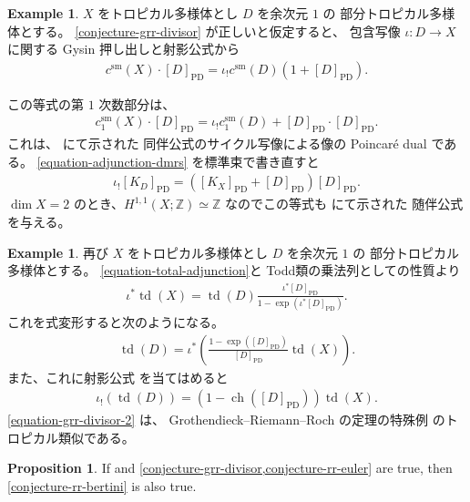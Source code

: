 \documentclass[a4paper,dvipdfmx,reqno,12pt]{amsart}
\theoremstyle{definition}
\newtheorem{example}[theorem]{Example}
\newtheorem{proposition}[theorem]{Proposition}
\newcommand{\opn}[1]{\operatorname{#1}}
\newcommand{\PD}[1]{[#1]_{\mathrm{PD}}}
\numberwithin{equation}{section}
\begin{document}
\begin{example}
     
$X$ をトロピカル多様体とし $D$ を余次元 $1$ の
部分トロピカル多様体とする。
\cref{conjecture-grr-divisor} が正しいと仮定すると、
包含写像
$\iota\colon D\to X$ に関する
Gysin 押し出しと射影公式から
\begin{align}
c^{\mathrm{sm}}(X)\cdot \PD{D}=\iota_!c^{\mathrm{sm}}(D)
(1+\PD{D}).
\end{align}

この等式の第 $1$ 次数部分は、
\begin{align}
\label{equation-adjunction-dmrs}
c^{\mathrm{sm}}_{1}(X)\cdot \PD{D}=\iota_!c^{\mathrm{sm}}_1(D)
+\PD{D}\cdot \PD{D}.
\end{align}
これは、
\cite[Theorem 5.2]{demedrano2023chern}にて示された
同伴公式のサイクル写像による像の
Poincar\'e dual である。
\eqref{equation-adjunction-dmrs} を標準束で書き直すと
\begin{align}
\iota_! \PD{K_D}=(\PD{K_X}+\PD{D})\PD{D}.
\end{align}
$\dim X=2$ のとき、$H^{1,1}(X;\mathbb{Z})\simeq \mathbb{Z}$
なのでこの等式も
\cite[Theorem 4.11]{shaw2015tropical} にて示された
随伴公式を与える。
\end{example}

\begin{example}
再び
$X$ をトロピカル多様体とし $D$ を余次元 $1$ の
部分トロピカル多様体とする。
\eqref{equation-total-adjunction}と
Todd類の乗法列としての性質より
\begin{align}
\iota^{*}\opn{td}(X)=
\opn{td}(D)\frac{\iota^{*}\PD{D}}
{1-\opn{exp}(\iota^{*}\PD{D})}.
\end{align}
これを式変形すると次のようになる。
\begin{align}
\opn{td}(D)
=\iota^{*}\left(
\frac{1-\opn{exp}(\PD{D})}{
\PD{D}}\opn{td}(X)\right).
\end{align}
また、これに射影公式
を当てはめると
\begin{align}
\label{equation-grr-divisor-2}
\iota_!(\opn{td}(D))=(1-\opn{ch}(\PD{D}))\opn{td}(X).
\end{align}
\eqref{equation-grr-divisor-2} は、
Grothendieck--Riemann--Roch の定理の特殊例
のトロピカル類似である。
\end{example}

\begin{proposition}
If \label{proposition-euler-to-bertini}
\cite[Conjecture 6.13]{demedrano2023chern} and
\cref{conjecture-grr-divisor,conjecture-rr-euler}
are true, then \cref{conjecture-rr-bertini} is also true. 
\end{proposition}
\end{document}
